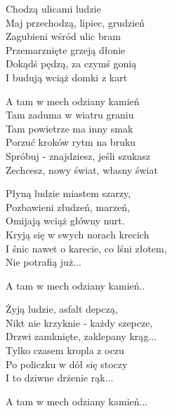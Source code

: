
\begin{text}
    Chodzą ulicami ludzie\\
    Maj przechodzą, lipiec, grudzień\\
    Zagubieni wśród ulic bram\\
    Przemarznięte grzeją dłonie\\
    Dokądś pędzą, za czymś gonią\\
    I budują wciąż domki z kart

    \vin A tam w mech odziany kamień\\
    \vin Tam zaduma w wiatru graniu\\
    \vin Tam powietrze ma inny smak\\
    \vin Porzuć kroków rytm na bruku\\
    \vin Spróbuj - znajdziesz, jeśli szukasz\\
    \vin Zechcesz, nowy świat, własny świat

    Płyną ludzie miastem szarzy,\\
    Pozbawieni złudzeń, marzeń,\\
    Omijają wciąż główny nurt.\\
    Kryją się w swych norach krecich\\
    I śnic nawet o karecie, co lśni złotem,\\
    Nie potrafią już...
    
    \vin A tam w mech odziany kamień..

    Żyją ludzie, asfalt depczą,\\
    Nikt nie krzyknie - każdy szepcze,\\
    Drzwi zamknięte, zaklepany krąg...\\
    Tylko czasem kropla z oczu\\
    Po policzku w dół się stoczy\\
    I to dziwne drżenie rąk...
    
    \vin A tam w mech odziany kamień...
\end{text}

